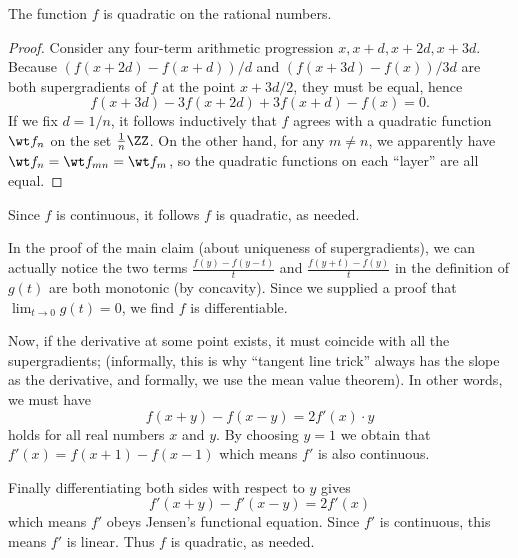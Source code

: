 \begin{claim*}
  The function $f$ is quadratic on the rational numbers.
\end{claim*}
\begin{proof}
Consider any four-term arithmetic progression $x, x+d, x+2d, x+3d$.
Because $(f(x+2d)-f(x+d))/d$ and $(f(x+3d)-f(x))/3d$ are both
supergradients of $f$ at the point $x+3d/2$, they must be equal, hence
\begin{equation} \label{quadratic}
  f(x+3d) - 3f(x+2d) + 3f(x+d) - f(x) = 0.
\end{equation}
If we fix $d = 1/n$, it follows inductively
that $f$ agrees with a quadratic function $\wt f_n$ on the set $\frac1n \ZZ$.
On the other hand, for any $m \neq n$,
we apparently have $\wt f_n = \wt f_{mn} = \wt f_m$,
so the quadratic functions on each ``layer'' are all equal.
\end{proof}
Since $f$ is continuous, it follows $f$ is quadratic, as needed.

\begin{remark*}
  In the proof of the main claim (about uniqueness of supergradients),
  we can actually notice the two terms $\frac{f(y)-f(y-t)}{t}$
  and $\frac{f(y+t)-f(y)}{t}$ in the definition of $g(t)$ are both monotonic
  (by concavity).
  Since we supplied a proof that $\lim_{t \to 0} g(t) = 0$,
  we find $f$ is differentiable.

  Now, if the derivative at some point exists,
  it must coincide with all the supergradients;
  (informally, this is why ``tangent line trick'' always has the slope
  as the derivative, and formally, we use the mean value theorem).
  In other words, we must have
  \[ f(x+y) - f(x-y) = 2f'(x) \cdot y \]
  holds for all real numbers $x$ and $y$.
  By choosing $y=1$ we obtain that $f'(x) = f(x+1) - f(x-1)$
  which means $f'$ is also continuous.

  Finally differentiating both sides with respect to $y$ gives
  \[ f'(x+y) - f'(x-y) = 2f'(x) \]
  which means $f'$ obeys Jensen's functional equation.
  Since $f'$ is continuous, this means $f'$ is linear.
  Thus $f$ is quadratic, as needed.
\end{remark*}
